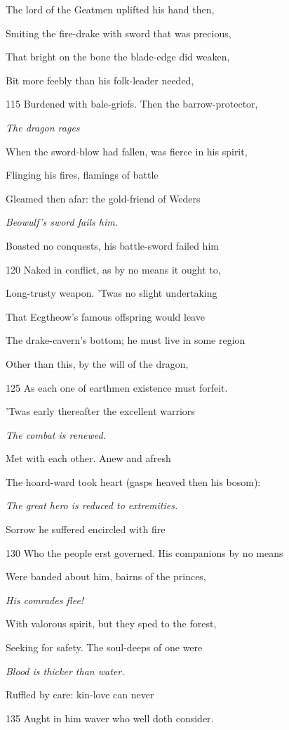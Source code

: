The lord of the Geatmen uplifted his hand then,

Smiting the fire-drake with sword that was precious,

That bright on the bone the blade-edge did weaken,

Bit more feebly than his folk-leader needed,

115
Burdened with bale-griefs. Then the barrow-protector,

\emph{The dragon rages}

When the sword-blow had fallen, was fierce in his spirit,

Flinging his fires, flamings of battle

Gleamed then afar: the gold-friend of Weders

\emph{Beowulf’s sword
fails him.}

Boasted no conquests, his battle-sword failed him

120
Naked in conflict, as by no means it ought to,

Long-trusty weapon. ’Twas no slight undertaking

That Ecgtheow’s famous offspring would leave

The drake-cavern’s bottom; he must live in some region

Other than this, by the will of the dragon,

125
As each one of earthmen existence must forfeit.

’Twas early thereafter the excellent warriors

\emph{The combat is
renewed.}

Met with each other. Anew and afresh

The hoard-ward took heart (gasps heaved then his bosom):

\emph{The great hero is
reduced to extremities.}

Sorrow he suffered encircled with fire

130
Who the people erst governed. His companions by no means

Were banded about him, bairns of the princes,

\emph{His comrades flee!}

With valorous spirit, but they sped to the forest,

Seeking for safety. The soul-deeps of one were

\emph{Blood is thicker
than water.}

Ruffled by care: kin-love can never

135
Aught in him waver who well doth consider.

